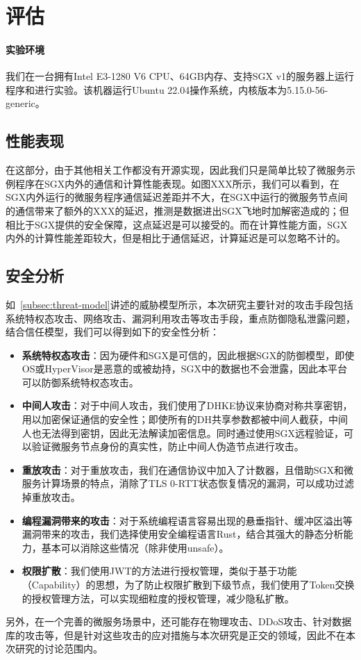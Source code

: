 \section{评估}\label{sec:evaluation}

\paragraph{实验环境}

我们在一台拥有Intel E3-1280 V6 CPU、64GB内存、支持SGX v1的服务器上运行程序和进行实验。该机器运行Ubuntu 22.04操作系统，内核版本为5.15.0-56-generic。

\subsection{性能表现}

在这部分，由于其他相关工作都没有开源实现，因此我们只是简单比较了微服务示例程序在SGX内外的通信和计算性能表现。如图XXX所示，我们可以看到，在SGX内外运行的微服务程序通信延迟差距并不大，在SGX中运行的微服务节点间的通信带来了额外的XXX的延迟，推测是数据进出SGX飞地时加解密造成的；但相比于SGX提供的安全保障，这点延迟是可以接受的。而在计算性能方面，SGX内外的计算性能差距较大，但是相比于通信延迟，计算延迟是可以忽略不计的。


\subsection{安全分析}

如~\cref{subsec:threat-model}讲述的威胁模型所示，本次研究主要针对的攻击手段包括系统特权态攻击、网络攻击、漏洞利用攻击等攻击手段，重点防御隐私泄露问题，结合信任模型，我们可以得到如下的安全性分析：

\begin{itemize}
    \item \textbf{系统特权态攻击}：因为硬件和SGX是可信的，因此根据SGX的防御模型，即使OS或HyperVisor是恶意的或被劫持，SGX中的数据也不会泄露，因此本平台可以防御系统特权态攻击。
    \item \textbf{中间人攻击}：对于中间人攻击，我们使用了DHKE协议来协商对称共享密钥，用以加密保证通信的安全性；即使所有的DH共享参数都被中间人截获，中间人也无法得到密钥，因此无法解读加密信息。同时通过使用SGX远程验证，可以验证微服务节点身份的真实性，防止中间人伪造节点进行攻击。
    \item \textbf{重放攻击}：对于重放攻击，我们在通信协议中加入了计数器，且借助SGX和微服务计算场景的特点，消除了TLS 0-RTT状态恢复情况的漏洞，可以成功过滤掉重放攻击。
    \item \textbf{编程漏洞带来的攻击}：对于系统编程语言容易出现的悬垂指针、缓冲区溢出等漏洞带来的攻击，我们选择使用安全编程语言Rust，结合其强大的静态分析能力，基本可以消除这些情况（除非使用unsafe）。
    \item \textbf{权限扩散}：我们使用JWT的方法进行授权管理，类似于基于功能（Capability）的思想，为了防止权限扩散到下级节点，我们使用了Token交换的授权管理方法，可以实现细粒度的授权管理，减少隐私扩散。
\end{itemize}

另外，在一个完善的微服务场景中，还可能存在物理攻击、DDoS攻击、针对数据库的攻击等，但是针对这些攻击的应对措施与本次研究是正交的领域，因此不在本次研究的讨论范围内。
